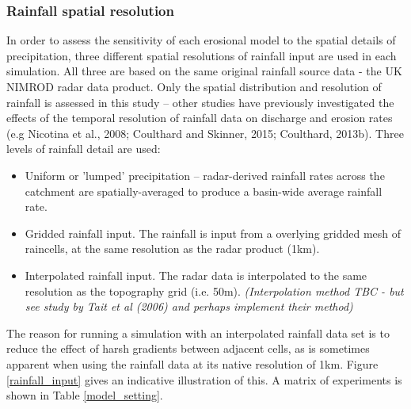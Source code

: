 
\subsubsection{Rainfall spatial resolution}
In order to assess the sensitivity of each erosional model to the spatial details of precipitation, three different spatial resolutions of rainfall input are used in each simulation. All three are based on the same original rainfall source data - the UK NIMROD radar data product. Only the spatial distribution and resolution of rainfall is assessed in this study -- other studies have previously investigated the effects of the temporal resolution of rainfall data on discharge and erosion rates (e.g Nicotina et al., 2008; Coulthard and Skinner, 2015; Coulthard, 2013b). Three levels of rainfall detail are used: 

\begin{itemize}
\item Uniform or 'lumped' precipitation -- radar-derived rainfall rates across the catchment are spatially-averaged to produce a basin-wide average rainfall rate.  
\item Gridded rainfall input. The rainfall is input from a overlying gridded mesh of raincells, at the same resolution as the radar product (1km).
\item Interpolated rainfall input. The radar data is interpolated to the same resolution as the topography grid (i.e. 50m). \textit{(Interpolation method TBC - but see study by Tait et al (2006) and perhaps implement their method) }
\end{itemize}

The reason for running a simulation with an interpolated rainfall data set is to reduce the effect of harsh gradients between adjacent cells, as is sometimes apparent when using the rainfall data at its native resolution of 1km. Figure \ref{rainfall_input} gives an indicative illustration of this. A matrix of experiments is shown in Table \ref{model_setting}.

